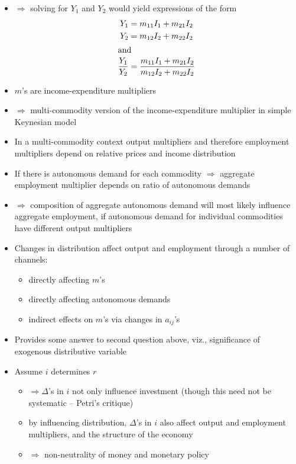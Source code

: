 \documentclass[a4paper,twoside]{article}
\numberwithin{equation}{section}
\numberwithin{figure}{section}
\begin{document}
\begin{itemize}
		\item \( \Rightarrow \) solving for \( Y_1 \) and \( Y_2 \) would yield expressions of the form
		\begin{align}
			Y_1 &= m_{11}I_1 + m_{21}I_2 \notag\\
			Y_2 &= m_{12}I_2 + m_{22}I_2 \notag\\
			\intertext{and}
			\frac{Y_1}{Y_2} &= \frac{m_{11}I_1 + m_{21}I_2}{m_{12}I_2 + m_{22}I_2}
		\end{align}
		\item \( m \)'s are income-expenditure multipliers
		\item \textcolor{myred}{\( \Rightarrow \) multi-commodity version of the income-expenditure multiplier in simple Keynesian model}
		\item In a multi-commodity context output multipliers and therefore employment multipliers depend on relative prices and income distribution
		\item If there is autonomous demand for each commodity \( \Rightarrow \) aggregate employment multiplier depends on ratio of autonomous demands
		\item \( \Rightarrow \) composition of aggregate autonomous demand will most likely influence aggregate employment, if autonomous demand for individual commodities have different output multipliers
		\item Changes in distribution affect output and employment through a number of channels:
		\begin{itemize}
			\item directly affecting \( m \)'s
			\item directly affecting autonomous demands
			\item indirect effects on \( m \)'s via changes in \( a_{ij} \)'s
		\end{itemize}
		\item Provides some answer to second question above, viz., significance of exogenous distributive variable
		\item Assume \( i \) determines \( r \)
		\begin{itemize}
			\item \( \Rightarrow \Delta \)'s in \( i \) not only influence investment (though this need not be systematic -- Petri's critique)
			\item by influencing distribution, \( \Delta \)'s in \( i \) also affect output and employment multipliers, and the structure of the economy
			\item \textcolor{myred}{\( \Rightarrow \) non-neutrality of money and monetary policy}
		\end{itemize}
	\end{itemize}
\end{document}

